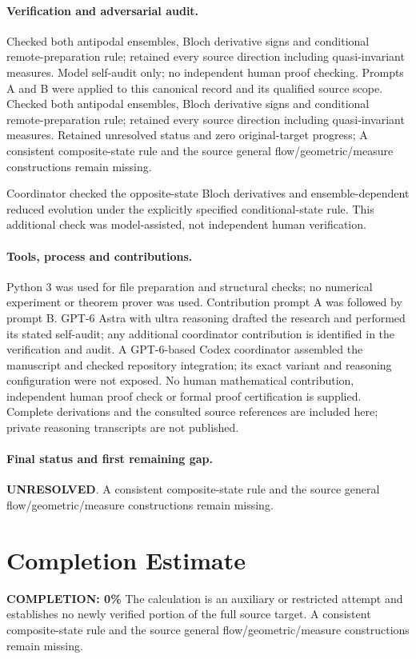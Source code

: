 \documentclass[11pt]{article}
\begin{document}
\paragraph{Verification and adversarial audit.}
Checked both antipodal ensembles, Bloch derivative signs and conditional remote-preparation rule; retained every source direction including quasi-invariant measures. Model self-audit only; no independent human proof checking. Prompts A and B were applied to this canonical record and its qualified source scope. Checked both antipodal ensembles, Bloch derivative signs and conditional remote-preparation rule; retained every source direction including quasi-invariant measures. Retained unresolved status and zero original-target progress; A consistent composite-state rule and the source general flow/geometric/measure constructions remain missing.

Coordinator checked the opposite-state Bloch derivatives and ensemble-dependent reduced evolution under the explicitly specified conditional-state rule. This additional check was model-assisted, not independent human verification.

\paragraph{Tools, process and contributions.}
Python 3 was used for file preparation and structural checks; no numerical experiment or theorem prover was used. Contribution prompt A was followed by prompt B. GPT-6 Astra with ultra reasoning drafted the research and performed its stated self-audit; any additional coordinator contribution is identified in the verification and audit. A GPT-6-based Codex coordinator assembled the manuscript and checked repository integration; its exact variant and reasoning configuration were not exposed. No human mathematical contribution, independent human proof check or formal proof certification is supplied. Complete derivations and the consulted source references are included here; private reasoning transcripts are not published.

\paragraph{Final status and first remaining gap.}
\textbf{UNRESOLVED}. A consistent composite-state rule and the source general flow/geometric/measure constructions remain missing.

\section{Completion Estimate}
\noindent\textbf{COMPLETION: 0\%}
The calculation is an auxiliary or restricted attempt and establishes no newly verified portion of the full source target. A consistent composite-state rule and the source general flow/geometric/measure constructions remain missing.
\end{document}
